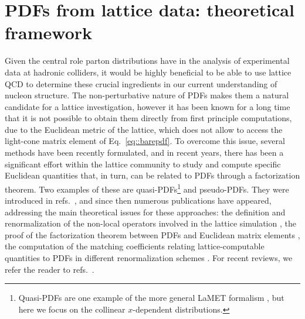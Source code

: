 \chapter{PDFs from lattice data: theoretical framework}
\label{ch:scalar_model}
 
Given the central role parton distributions have in the analysis
of experimental data at hadronic colliders, it would be highly beneficial to be
able to use lattice QCD to determine these crucial ingredients in our current
understanding of nucleon structure.
The non-perturbative nature of PDFs makes them a natural candidate for a lattice investigation,
however it has been known for a long time that it is not possible to
obtain them directly from first principle computations, due to the Euclidean metric of the
lattice, which does not allow to access the light-cone matrix element of Eq.~\eqref{eq::barepdf}.
To overcome this issue, several methods have been recently formulated, 
and in recent years, there has been a significant effort within the lattice
community to study and compute specific Euclidean quantities that, in turn, can be related to PDFs
through a factorization theorem.
%
Two examples of these are quasi-PDFs\footnote{Quasi-PDFs are one example of the more general LaMET formalism \cite{Ji:2014gla,Ji:2020ect}, 
but here we focus on the collinear $x$-dependent distributions.} and pseudo-PDFs.
They were introduced in
refs.~\cite{PhysRevLett.110.262002, Radyushkin:2017cyf}, and since then numerous
publications have appeared, addressing the main theoretical issues for these
approaches: the definition and renormalization of
the non-local operators involved in the lattice simulation
\cite{Ji:2015jwa,Ishikawa:2016znu,Constantinou:2017sej,Alexandrou:2017huk,Ji:2017rah,Ji:2017oey,Ishikawa:2017faj,Green:2017xeu,Radyushkin:2018nbf,Zhang:2018diq,Li:2018tpe}, 
the proof of the factorization theorem between PDFs and Euclidean matrix elements
\cite{Xiong:2013bka,Ji:2014gla,Ma:2014jla,Briceno:2017cpo,Ma:2017pxb,Izubuchi:2018srq}, the computation of the
matching coefficients relating lattice-computable quantities to PDFs in different renormalization schemes
\cite{Xiong:2013bka,Ma:2014jla,Ji:2015qla,Xiong:2015nua,Ma:2017pxb,Wang:2017qyg,Stewart:2017tvs,Izubuchi:2018srq,Alexandrou:2018pbm,Alexandrou:2018eet,Liu:2018uuj,Liu:2018hxv}.  
For recent reviews, we refer the reader to
refs.~\cite{DelDebbio:2018siw,Monahan:2018euv,Zhao:2018fyu,Cichy:2018mum,
Radyushkin:2019mye,Ji:2020ect,Lin:2020rut}. 

